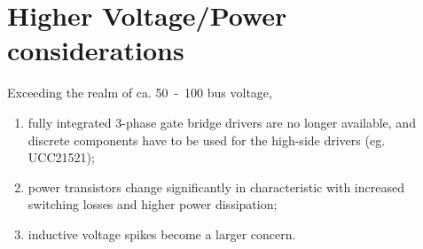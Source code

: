 \documentclass[12pt,a4paper,oneside,openany]{article}
\begin{document}
\section{Higher Voltage/Power considerations}

Exceeding the realm of ca. \unit{50-100}{\volt} bus voltage, 
\begin{enumerate}
\item fully integrated 3-phase gate bridge drivers are no longer available, and discrete components have to be used for the high-side drivers (eg. UCC21521);
\item power transistors change significantly in characteristic with increased switching losses and higher power dissipation;
\item inductive voltage spikes become a larger concern.
\end{enumerate}



\nocite{*}

%
%
\printbibliography
\end{document}
